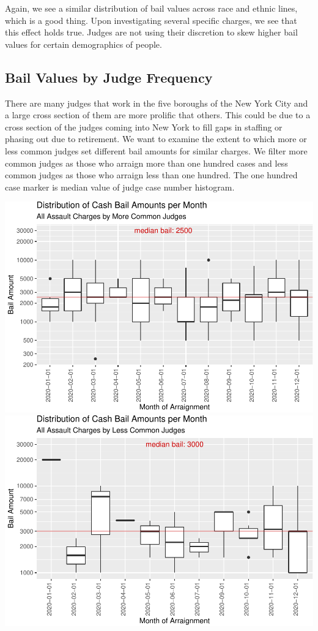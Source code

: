 \documentclass[
  english,
  man]{apa6}
\begin{document}
Again, we see a similar distribution of bail values across race and ethnic lines, which is a good thing. Upon investigating several specific charges, we see that this effect holds true. Judges are not using their discretion to skew higher bail values for certain demographics of people.

\hypertarget{bail-values-by-judge-frequency}{%
\subsection{Bail Values by Judge Frequency}\label{bail-values-by-judge-frequency}}

There are many judges that work in the five boroughs of the New York City and a large cross section of them are more prolific that others. This could be due to a cross section of the judges coming into New York to fill gaps in staffing or phasing out due to retirement. We want to examine the extent to which more or less common judges set different bail amounts for similar charges. We filter more common judges as those who arraign more than one hundred cases and less common judges as those who arraign less than one hundred. The one hundred case marker is median value of judge case number histogram.

\includegraphics{bail_reform_shamp_thesis_files/figure-latex/more_less_judge-1.pdf} \includegraphics{bail_reform_shamp_thesis_files/figure-latex/more_less_judge-2.pdf}
\end{document}
